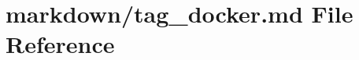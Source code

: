 \hypertarget{tag__docker_8md}{}\section{markdown/tag\+\_\+docker.md File Reference}
\label{tag__docker_8md}
